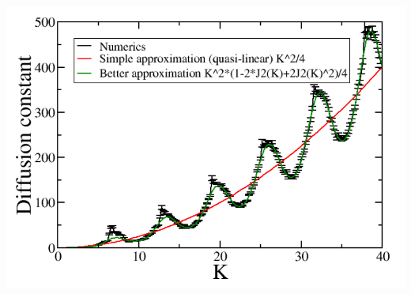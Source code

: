 \documentclass[aspectratio=169,xcolor=dvipsnames,7pt]{beamer}
\begin{document}
\begin{frame}
\begin{columns}
\begin{column}{0.59\textwidth}
{			\hspace*{3mm}
			\includegraphics[height=.45\textheight]{D3}
			}
		\end{column}
	\end{columns}
\end{frame}





 \begin{frame}
     \printbibliography
 \end{frame} 
\end{document}
